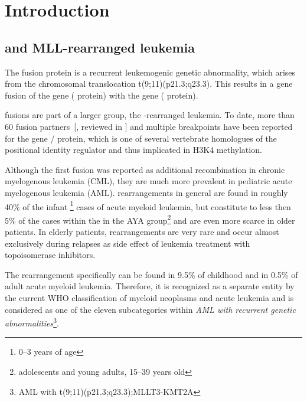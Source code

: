 \chapter{Introduction}
\minitoc

\section{\mllafnine and MLL-rearranged leukemia}
\label{chap:i:abridged:leukemia}

The \mllafnine  fusion protein is a recurrent leukemogenic genetic abnormality, which arises from the chromosomal translocation t(9;11)(p21.3;q23.3). This results in a gene fusion of the  gene ( protein) with the  gene ( protein)\cite{Ziemin-vanderPoel1991,Thirman1993}. 

\mllafnine fusions are part of a larger group, the -rearranged leukemia. To date, more than 60 fusion partners~[, reviewed in ] and multiple breakpoints\cite{Kobayashi1993} have been reported for the  gene /  protein, which is one of several vertebrate homologues of the  positional identity regulator \cite{Tkachuk1992,Djabali1992} and thus implicated in H3K4 methylation. 

Although the first  fusion was reported as additional recombination in chronic myelogenous leukemia (CML)\cite{Rowley1973}, they are much more prevalent in pediatric acute myelogenous leukemia (AML)\cite{Sorensen1994,Balgobind2009}.  rearrangements in general are found in roughly 40\% of the infant \footnote{\numrange{0}{3} years of age} cases of acute myeloid leukemia, but constitute to less then 5\% of the cases within the in the AYA group\footnote{adolescents and young adults, \numrange{15}{39} years old} and are even more scarce in older patients\cite{Bolouri2017}. In elderly patients,  rearrangements are very rare and occur almost exclusively during relapses as side effect of leukemia treatment with topoisomerase inhibitors\cite{Super1993}. 

The \mllafnine rearrangement specifically can be found in 9.5\% of childhood and in 0.5\% of adult acute myeloid leukemia\cite{Balgobind2009}. Therefore, it is recognized as a separate entity by the current WHO classification of myeloid neoplasms and acute leukemia and is considered as one of the eleven subcategories within \emph{AML with recurrent genetic abnormalities}\footnote{AML with t(9;11)(p21.3;q23.3);MLLT3-KMT2A}\cite{Arber2016}.

